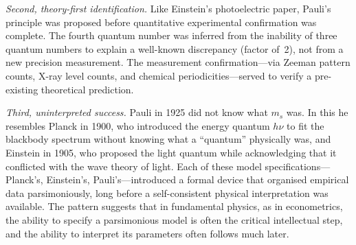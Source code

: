 \documentclass[12pt]{article}
\begin{document}
\medskip
\emph{Second, theory-first identification.}  Like Einstein's photoelectric
paper, Pauli's principle was proposed before quantitative experimental
confirmation was complete.  The fourth quantum number was inferred from
the inability of three quantum numbers to explain a well-known discrepancy
(factor of~2), not from a new precision measurement.  The measurement
confirmation---via Zeeman pattern counts, X-ray level counts, and chemical
periodicities---served to verify a pre-existing theoretical prediction.

\medskip
\emph{Third, uninterpreted success.}  Pauli in 1925 did not know what $m_s$
was.  In this he resembles Planck in 1900, who introduced the energy quantum
$h\nu$ to fit the blackbody spectrum without knowing what a ``quantum''
physically was, and Einstein in 1905, who proposed the light quantum while
acknowledging that it conflicted with the wave theory of light.  Each of these
model specifications---Planck's, Einstein's, Pauli's---introduced a formal
device that organised empirical data parsimoniously, long before a
self-consistent physical interpretation was available.  The pattern suggests
that in fundamental physics, as in econometrics, the ability to specify a
parsimonious model is often the critical intellectual step, and the ability to
interpret its parameters often follows much later.

\bigskip


\end{document}
